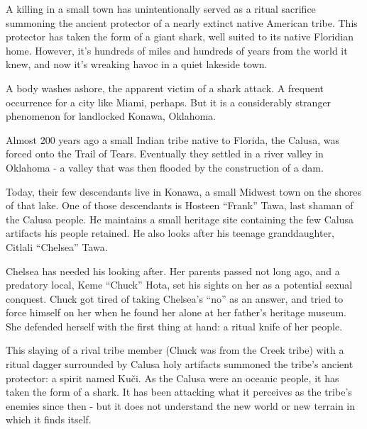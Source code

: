 \documentclass{motw}
\begin{document}




A killing in a small town has unintentionally served as a ritual sacrifice summoning the ancient protector of a nearly extinct native American tribe. This protector has taken the form of a giant shark, well suited to its native Floridian home.  However, it's hundreds of miles and hundreds of years from the world it knew, and now it's wreaking havoc in a quiet lakeside town.


A body washes ashore, the apparent victim of a shark attack.  A frequent occurrence for a city like Miami, perhaps.  But it is a considerably stranger phenomenon for landlocked Konawa, Oklahoma.


Almost 200 years ago a small Indian tribe native to Florida, the Calusa, was forced onto the Trail of Tears.  Eventually they settled in a river valley in Oklahoma - a valley that was then flooded by the construction of a dam.

Today, their few descendants live in Konawa, a small Midwest town on the shores  of that lake.  One of those descendants is Hosteen “Frank” Tawa, last shaman of the Calusa people. He maintains a small heritage site containing the few Calusa artifacts his people retained. He also looks after his teenage granddaughter, Citlali “Chelsea” Tawa.

Chelsea has needed his looking after. Her parents passed not long ago, and a predatory local, Keme “Chuck” Hota, set his sights on her as a potential sexual conquest. Chuck got tired of taking Chelsea’s “no” as an answer, and tried to force himself on her when he found her alone at her father’s heritage museum. She defended herself with the first thing at hand: a ritual knife of her people. 

This slaying of a rival tribe member (Chuck was from the Creek tribe) with a ritual dagger surrounded by Calusa holy artifacts summoned the tribe’s ancient protector: a spirit named Kuči.  As the Calusa were an oceanic people, it has taken the form of a shark.  It has been attacking what it perceives as the tribe’s enemies since then - but it does not understand the new world or new terrain in which it finds itself.
\end{document}
